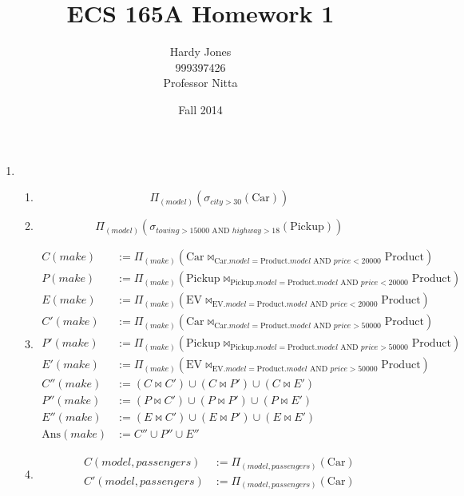 \documentclass[12pt,letterpaper]{article}
\title{ECS 165A Homework 1\vspace{-2ex}}
\author{Hardy Jones\\
        999397426\\
        Professor Nitta\vspace{-2ex}}
\date{Fall 2014}
\newcommand{\parens}[1]{\left(#1\right)}
\newcommand{\Ans}[0]{\text{Ans}}
\newcommand{\Car}[0]{\text{Car}}
\newcommand{\EV}[0]{\text{EV}}
\newcommand{\Pickup}[0]{\text{Pickup}}
\newcommand{\Product}[0]{\text{Product}}
\newcommand{\AND}[0]{\text{ AND }}
\begin{document}
  \maketitle

  \begin{enumerate}
    \item
      \begin{enumerate}
        \item \[\Pi_{\parens{model}}\parens{\sigma_{city > 30}\parens{\Car}}\]
        \item \[\Pi_{\parens{model}}\parens{\sigma_{towing > 15000 \AND highway > 18}\parens{\Pickup}}\]
        \item
          \begin{align*}
            C(make)  &:= \Pi_{\parens{make}}\parens{\Car \bowtie_{\Car.model = \Product.model \AND price < 20000} \Product} \\
            P(make)  &:= \Pi_{\parens{make}}\parens{\Pickup \bowtie_{\Pickup.model = \Product.model \AND price < 20000} \Product} \\
            E(make)  &:= \Pi_{\parens{make}}\parens{\EV \bowtie_{\EV.model = \Product.model \AND price < 20000} \Product} \\
            C'(make) &:= \Pi_{\parens{make}}\parens{\Car \bowtie_{\Car.model = \Product.model \AND price > 50000} \Product} \\
            P'(make) &:= \Pi_{\parens{make}}\parens{\Pickup \bowtie_{\Pickup.model = \Product.model \AND price > 50000} \Product} \\
            E'(make) &:= \Pi_{\parens{make}}\parens{\EV \bowtie_{\EV.model = \Product.model \AND price > 50000} \Product} \\
            C''(make) &:= \parens{C \bowtie C'} \cup \parens{C \bowtie P'} \cup \parens{C \bowtie E'} \\
            P''(make) &:= \parens{P \bowtie C'} \cup \parens{P \bowtie P'} \cup \parens{P \bowtie E'} \\
            E''(make) &:= \parens{E \bowtie C'} \cup \parens{E \bowtie P'} \cup \parens{E \bowtie E'} \\
            \Ans(make) &:= C'' \cup P'' \cup E''
          \end{align*}
        \item
          \begin{align*}
            C(model, passengers) &:= \Pi_{\parens{model, passengers}}\parens{\Car} \\
            C'(model, passengers) &:= \Pi_{\parens{model, passengers}}\parens{\Car} \\

\end{align*}
\end{enumerate}
\end{enumerate}
\end{document}
